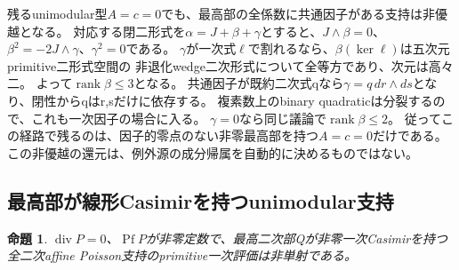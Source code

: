 \documentclass[a4paper,11pt]{ltjsarticle}
\newtheorem{proposition}{命題}[section]
\theoremstyle{definition}
\begin{document}
残るunimodular型$A=c=0$でも、最高部の全係数に共通因子がある支持は非優越となる。
対応する閉二形式を$\alpha=J+\beta+\gamma$とすると、$J\wedge\beta=0$、
$\beta^2=-2J\wedge\gamma$、$\gamma^2=0$である。
$\gamma$が一次式$\ell$で割れるなら、$\beta(\ker\ell)$は五次元primitive二形式空間の
非退化wedge二次形式について全等方であり、次元は高々二。
よって$\operatorname{rank}\beta\le3$となる。
共通因子が既約二次式qなら$\gamma=q\,dr\wedge ds$となり、閉性からqはr,sだけに依存する。
複素数上のbinary quadraticは分裂するので、これも一次因子の場合に入る。
$\gamma=0$なら同じ議論で$\operatorname{rank}\beta\le2$。
従ってこの経路で残るのは、因子的零点のない非零最高部を持つ$A=c=0$だけである。
この非優越の還元は、例外源の成分帰属を自動的に決めるものではない。

\subsection{最高部が線形Casimirを持つunimodular支持}
\begin{proposition}\label{prop:unimodular-linear-casimir}
$\operatorname{div}P=0$、$\operatorname{Pf}P$が非零定数で、最高二次部Qが非零一次Casimirを持つ
全二次affine Poisson支持のprimitive一次評価は非単射である。
\end{proposition}
\end{document}
